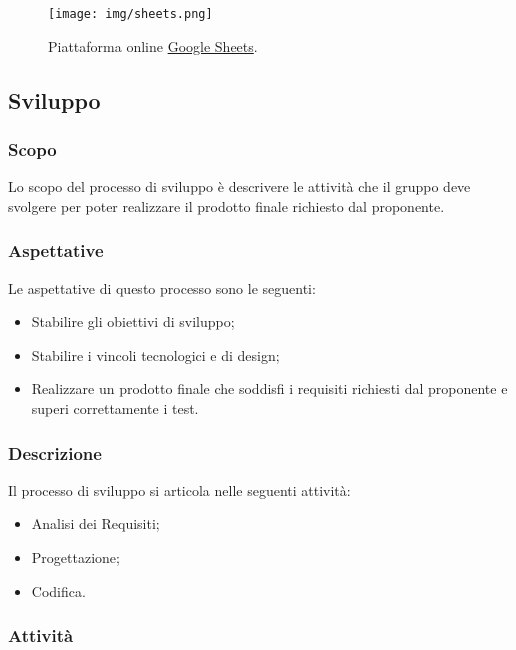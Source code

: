 \documentclass[../norme-di-progetto.tex]{subfiles}
\begin{document}
\begin{figure}[H]
  \centering
  \texttt{[image: img/sheets.png]}
  \label{fig:sheets}
  \caption{Piattaforma online \href{https://docs.google.com/spreadsheets/u/0/}{Google Sheets}.}
\end{figure}

\subsection{Sviluppo}

\subsubsection{Scopo}
Lo scopo del processo di sviluppo è descrivere le attività che il gruppo deve svolgere per poter realizzare il prodotto finale richiesto dal proponente.

\subsubsection{Aspettative}
Le aspettative di questo processo sono le seguenti:
\begin{itemize}
  \item Stabilire gli obiettivi di sviluppo;
  \item Stabilire i vincoli tecnologici e di design;
  \item Realizzare un prodotto finale che soddisfi i requisiti richiesti dal proponente e superi correttamente i test.
\end{itemize}

\subsubsection{Descrizione}
Il processo di sviluppo si articola nelle seguenti attività:
\begin{itemize}
  \item Analisi dei Requisiti;
  \item Progettazione;
  \item Codifica.
\end{itemize}

\subsubsection{Attività}
\end{document}
